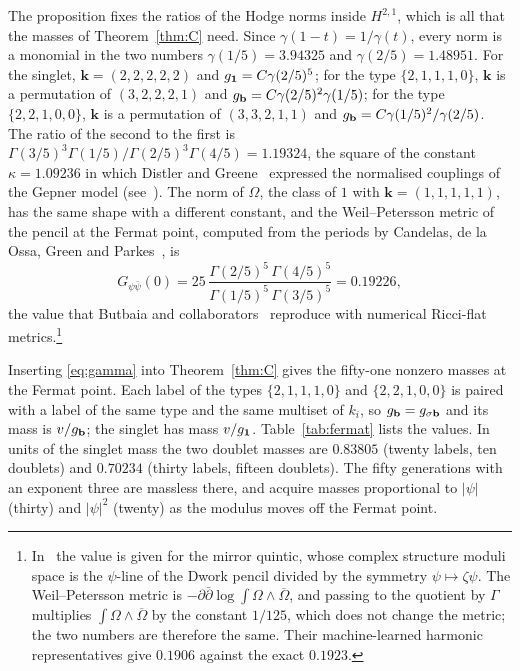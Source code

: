 The proposition fixes the ratios of the Hodge norms inside $H^{2,1}$, which
is all that the masses of Theorem~\ref{thm:C} need. Since $\gamma(1-t)=
1/\gamma(t)$, every norm is a monomial in the two numbers
$\gamma(1/5)=3.94325$ and $\gamma(2/5)=1.48951$. For the singlet,
$\mathbf k=(2,2,2,2,2)$ and $g_{\mathbf{1}}=C\gamma(2/5)^5$; for the type
$\{2,1,1,1,0\}$, $\mathbf k$ is a permutation of $(3,2,2,2,1)$ and
$g_{\mathbf{b}}=C\gamma(2/5)^2\gamma(1/5)$; for the type $\{2,2,1,0,0\}$,
$\mathbf k$ is a permutation of $(3,3,2,1,1)$ and $g_{\mathbf{b}}=C\gamma(1/5)^2/
\gamma(2/5)$. The ratio of the second to the first is
$\Gamma(3/5)^3\Gamma(1/5)/\Gamma(2/5)^3\Gamma(4/5)=1.19324$, the square of
the constant $\kappa=1.09236$ in which Distler and Greene~\cite{DG88}
expressed the normalised couplings of the Gepner model
(see~\cite[eq.~(4.3)]{BMT24}). The norm of $\Omega$, the class of $1$ with
$\mathbf k=(1,1,1,1,1)$, has the same shape with a different constant, and
the Weil--Petersson metric of the pencil at the Fermat point, computed from
the periods by Candelas, de la Ossa, Green and Parkes~\cite{CDGP91}, is
\[
G_{\psi\bar\psi}(0)=25\,\frac{\Gamma(2/5)^5\,\Gamma(4/5)^5}
{\Gamma(1/5)^5\,\Gamma(3/5)^5}=0.19226,
\]
the value that Butbaia and collaborators~\cite{BMT24} reproduce with
numerical Ricci-flat metrics.\footnote{In~\cite{BMT24} the value is given
for the mirror quintic, whose complex structure moduli space is the
$\psi$-line of the Dwork pencil divided by the symmetry
$\psi\mapsto\zeta\psi$. The Weil--Petersson metric is
$-\partial\bar\partial\log\int\Omega\wedge\overline\Omega$, and passing to
the quotient by $\Gamma$ multiplies $\int\Omega\wedge\overline\Omega$ by the
constant $1/125$, which does not change the metric; the two numbers are
therefore the same. Their machine-learned harmonic representatives give
$0.1906$ against the exact $0.1923$.}

Inserting \eqref{eq:gamma} into Theorem~\ref{thm:C} gives the fifty-one
nonzero masses at the Fermat point. Each label of the types
$\{2,1,1,1,0\}$ and $\{2,2,1,0,0\}$ is paired with a label of the same type
and the same multiset of $k_i$, so $g_{\mathbf{b}}=g_{\sigma\mathbf{b}}$ and its mass is
$v/g_{\mathbf{b}}$; the singlet has mass $v/g_{\mathbf{1}}$. Table~\ref{tab:fermat} lists
the values. In units of the singlet mass the two doublet masses are
$0.83805$ (twenty labels, ten doublets) and $0.70234$ (thirty labels,
fifteen doublets). The fifty generations with an exponent three are
massless there, and acquire masses proportional to $|\psi|$ (thirty) and
$|\psi|^2$ (twenty) as the modulus moves off the Fermat point.

